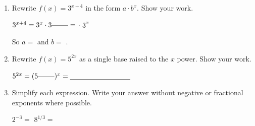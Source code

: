 \documentclass[10pt]{article}
\begin{document}
\namedateperiod

\vspace{0.16in}

\begin{enumerate}[itemsep=20pt]

\item Rewrite $f(x) = 3^{x+4}$ in the form $a \cdot b^x$. Show your work.

      \vspace{0.06in}
      $3^{x+4} = 3^x \cdot 3^{\blank{0.8cm}} = $ \blank{2cm} $\cdot\; 3^x$

      So $a = $ \blank{2cm} and $b = $ \blank{2cm}.

\item Rewrite $f(x) = 5^{2x}$ as a single base raised to the $x$ power. Show your work.

      \vspace{0.06in}
      $5^{2x} = (5^{\blank{0.8cm}})^x = \blank{3cm}$

\item Simplify each expression. Write your answer without negative or fractional exponents
      where possible.

      \vspace{0.06in}
      $2^{-3} = $ \blank{3cm} \qquad\qquad $8^{1/3} = $ \blank{3cm}

\end{enumerate}
\end{document}

